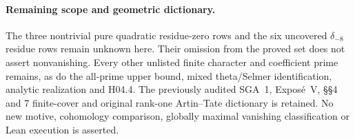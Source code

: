\paragraph{Remaining scope and geometric dictionary.}
The three nontrivial pure quadratic residue-zero rows and the
six uncovered $\delta_{-8}$ residue rows remain unknown here.
Their omission from the proved set does not assert nonvanishing.
Every other unlisted finite character and coefficient prime remains,
as do the all-prime upper bound, mixed theta/Selmer identification,
analytic realization and H04.4.
The previously audited SGA~1, Expos\'e~V, \S\S4 and 7 finite-cover
and original rank-one Artin--Tate dictionary is retained.
No new motive, cohomology comparison, globally maximal vanishing
classification or Lean execution is asserted.
